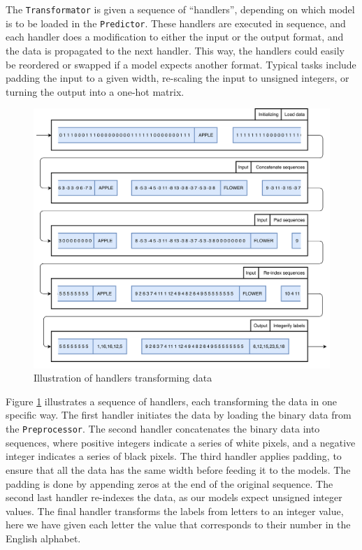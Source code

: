 The {\tt Transformator} is given a sequence of ``handlers'', depending on which model is to be loaded in the {\tt Predictor}. These handlers are executed in sequence, and each handler does a modification to either the input or the output format, and the data is propagated to the next handler. This way, the handlers could easily be reordered or swapped if a model expects another format. Typical tasks include padding the input to a given width, re-scaling the input to unsigned integers, or turning the output into a one-hot matrix.

\begin{figure}[ht]
    \centering
    \includegraphics[width=1\textwidth]{fig/development_process/transformator.png}
    \caption{Illustration of handlers transforming data}
    \label{fig:development-transformator}
\end{figure}

Figure \ref{fig:development-transformator} illustrates a sequence of handlers, each transforming the data in one specific way. The first handler initiates the data by loading the binary data from the {\tt Preprocessor}. The second handler concatenates the binary data into sequences, where positive integers indicate a series of white pixels, and a negative integer indicates a series of black pixels. The third handler applies padding, to ensure that all the data has the same width before feeding it to the models. The padding is done by appending zeros at the end of the original sequence. The second last handler re-indexes the data, as our models expect unsigned integer values. The final handler transforms the labels from letters to an integer value, here we have given each letter the value that corresponds to their number in the English alphabet.

